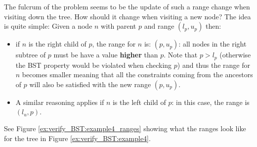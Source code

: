 The fulcrum of the problem seems to be the update of such a range change when visiting down the tree. How should it change when visiting a new node? 
The idea is quite simple:
Given a node $n$ with parent $p$ and range \( (l_p, u_p) \) then:
\begin{itemize}
	\item if $n$ is the right child of $p$, the range for $n$ is: $(p, u_p)$:
	all nodes in the right subtree of $p$ must be have a value \textbf{higher} than $p$. 
	Note that $p > l_p$ (otherwise the BST property would be violated when checking $p$) and thus the range for $n$ becomes smaller meaning that all the constraints coming from the ancestors of $p$ will also be satisfied with the new range $(p, u_p)$.
	\item A similar reasoning applies if $n$ is the left child of $p$: in this case, the range is $(l_u,p)$.
\end{itemize}
See Figure \ref{ex:verify_BST:example4_ranges} showing what the ranges look like for the tree in Figure \ref{ex:verify_BST:example4}. 


